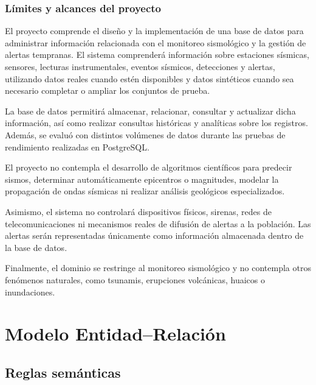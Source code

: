 \documentclass[12pt,a4paper]{article}
\begin{document}
\subsubsection{Límites y alcances del proyecto}

El proyecto comprende el diseño y la implementación de una base de datos para administrar información relacionada con el monitoreo sismológico y la gestión de alertas tempranas. El sistema comprenderá información sobre estaciones sísmicas, sensores, lecturas instrumentales, eventos sísmicos, detecciones y alertas, utilizando datos reales cuando estén disponibles y datos sintéticos cuando sea necesario completar o ampliar los conjuntos de prueba.

La base de datos permitirá almacenar, relacionar, consultar y actualizar dicha información, así como realizar consultas históricas y analíticas sobre los registros. Además, se evaluó con distintos volúmenes de datos durante las pruebas de rendimiento realizadas en PostgreSQL.

El proyecto no contempla el desarrollo de algoritmos científicos para predecir sismos, determinar automáticamente epicentros o magnitudes, modelar la propagación de ondas sísmicas ni realizar análisis geológicos especializados.

Asimismo, el sistema no controlará dispositivos físicos, sirenas, redes de telecomunicaciones ni mecanismos reales de difusión de alertas a la población. Las alertas serán representadas únicamente como información almacenada dentro de la base de datos.

Finalmente, el dominio se restringe al monitoreo sismológico y no contempla otros fenómenos naturales, como tsunamis, erupciones volcánicas, huaicos o inundaciones.


\section{Modelo Entidad--Relación}


\subsection{Reglas semánticas}
\end{document}
